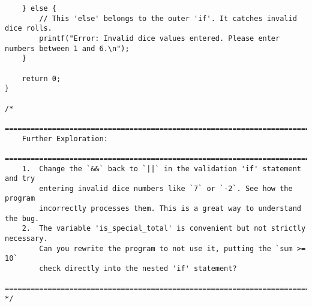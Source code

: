 \documentclass[11pt]{book}
\begin{document}
\begin{verbatim}
    } else {
        // This 'else' belongs to the outer 'if'. It catches invalid dice rolls.
        printf("Error: Invalid dice values entered. Please enter numbers between 1 and 6.\n");
    }

    return 0;
}

/*
    ================================================================================
    Further Exploration:
    ================================================================================
    1.  Change the `&&` back to `||` in the validation 'if' statement and try
        entering invalid dice numbers like `7` or `-2`. See how the program
        incorrectly processes them. This is a great way to understand the bug.
    2.  The variable 'is_special_total' is convenient but not strictly necessary.
        Can you rewrite the program to not use it, putting the `sum >= 10`
        check directly into the nested 'if' statement?
    ================================================================================
*/

\end{verbatim}
\clearpage
\end{document}
